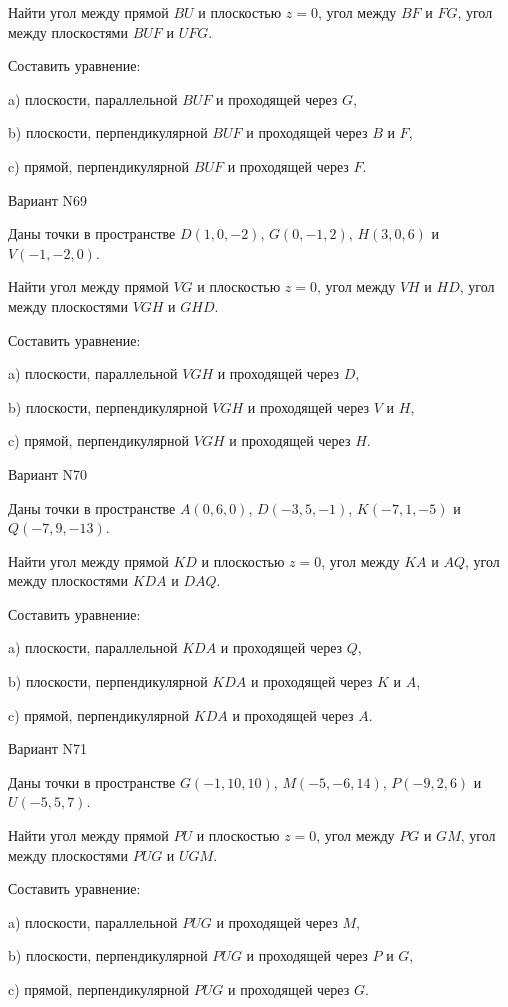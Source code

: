 \documentclass[11pt]{report}
\begin{document}
Найти угол между прямой $BU$ и плоскостью $z = 0$, угол между $BF$ и $FG$, угол между плоскостями $BUF$ 
и $UFG$.

Составить уравнение: 

a) плоскости, параллельной $BUF$ и проходящей через $G$,

b) плоскости, перпендикулярной $BUF$ и проходящей через $B$ и $F$,

c) прямой, перпендикулярной $BUF$ и проходящей через $F$.

Вариант N69

Даны точки в пространстве
$D(1, 0, -2)$, $G(0, -1, 2)$, $H(3, 0, 6)$ и
$V(-1, -2, 0)$.

Найти угол между прямой $VG$ и плоскостью $z = 0$, угол между $VH$ и $HD$, угол между плоскостями $VGH$ 
и $GHD$.

Составить уравнение: 

a) плоскости, параллельной $VGH$ и проходящей через $D$,

b) плоскости, перпендикулярной $VGH$ и проходящей через $V$ и $H$,

c) прямой, перпендикулярной $VGH$ и проходящей через $H$.

Вариант N70

Даны точки в пространстве
$A(0, 6, 0)$, $D(-3, 5, -1)$, $K(-7, 1, -5)$ и
$Q(-7, 9, -13)$.

Найти угол между прямой $KD$ и плоскостью $z = 0$, угол между $KA$ и $AQ$, угол между плоскостями $KDA$ 
и $DAQ$.

Составить уравнение: 

a) плоскости, параллельной $KDA$ и проходящей через $Q$,

b) плоскости, перпендикулярной $KDA$ и проходящей через $K$ и $A$,

c) прямой, перпендикулярной $KDA$ и проходящей через $A$.

Вариант N71

Даны точки в пространстве
$G(-1, 10, 10)$, $M(-5, -6, 14)$, $P(-9, 2, 6)$ и
$U(-5, 5, 7)$.

Найти угол между прямой $PU$ и плоскостью $z = 0$, угол между $PG$ и $GM$, угол между плоскостями $PUG$ 
и $UGM$.

Составить уравнение: 

a) плоскости, параллельной $PUG$ и проходящей через $M$,

b) плоскости, перпендикулярной $PUG$ и проходящей через $P$ и $G$,

c) прямой, перпендикулярной $PUG$ и проходящей через $G$.
\end{document}
